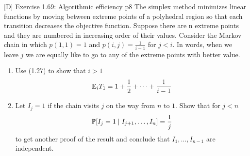 \documentclass[a4paper, 11pt]{article}
\begin{document}
\begin{problem}{%
		[D] Exercise 1.69: Algorithmic efficiency
	}{p8%
	}
The simplex method minimizes linear functions by
moving between extreme points of a polyhedral region so that each transition
decreases the objective function. Suppose there are n extreme points and they
are numbered in increasing order of their values. Consider the Markov chain in
which $p(1,1)=1$ and $p(i,j)=\frac1{i-1}$ for $j<i$. In words, when we leave $j$ we are equally like to go to any of the extreme points with better value. 
\begin{enumerate}[label=(\alph*)]
		\item Use (1.27) to show that $i>1$ $$\mathbb{E}_iT_1=1+\frac12+\cdots+\frac1{i-1}$$
		\item Let $I_j=1$ if the chain visits $j$ on the way from $n$ to $1$. Show that for $j<n$ $$\mathbb{P}[I_j=1\mid I_{j+1}, \dots, I_n]=\frac1j$$to get another proof of the result and conclude that $I_1,\dots, I_{n-1}$ are independent. 
	\end{enumerate}
\end{problem}
\end{document}
